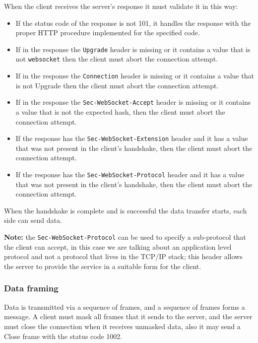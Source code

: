 When the client receives the server’s response it must validate it in this way:
\begin{itemize}
	\item If the status code of the response is not 101, it handles the response with the proper HTTP procedure implemented for the specified code.
	\item If in the response the \texttt{Upgrade} header is missing or it contains a value that is not \texttt{websocket} then the client must abort the connection attempt.
	\item If in the response the \texttt{Connection} header is missing or it contains a value that is not Upgrade then the client must abort the connection attempt.
	\item If in the response the \texttt{Sec-WebSocket-Accept} header is missing or it contains a value that is not the expected hash, then the client must abort the connection attempt.
	\item If the response has the \texttt{Sec-WebSocket-Extension} header and it has a value that was not present in the client’s handshake, then the client must abort the connection attempt.
	\item If the response has the \texttt{Sec-WebSocket-Protocol} header and it has a value that was not present in the client’s handshake, then the client must abort the connection attempt.
\end{itemize}

When the handshake is complete and is successful the data transfer starts, each side can send data.\newline

\textbf{Note:} the \texttt{Sec-WebSocket-Protocol} can be used to specify a sub-protocol that the client can accept, in this case we are talking about an application level protocol and not a protocol that lives in the TCP/IP stack; this header allows the server to provide the service in a suitable form for the client.

\subsubsection{Data framing}
Data is transmitted via a sequence of frames, and a sequence of frames forms a message.\newline
A client must mask all frames that it sends to the server, and the server must close the connection when it receives unmasked data, also it may send a Close frame with the status code 1002.\newline

